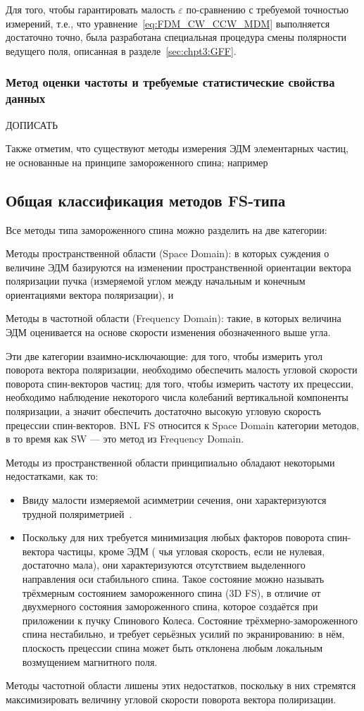 Для того, чтобы гарантировать малость $\varepsilon$ по-сравнению с требуемой точностью измерений, т.е., что уравнение~\eqref{eq:FDM_CW_CCW_MDM} выполняется достаточно точно, была разработана специальная процедура смены полярности ведущего поля, описанная в разделе~\ref{sec:chpt3:GFF}.

\subsubsection{Метод оценки частоты и требуемые статистические свойства данных}
ДОПИСАТЬ

Также отметим, что существуют методы измерения ЭДМ элементарных частиц, не основанные на принципе замороженного спина; например~\cite{COSY:SpinTuneMapping}

\subsection{Общая классификация методов FS-типа}
Все методы типа замороженного спина можно разделить на две категории: 
\begin{enumerate*}
	\item Методы пространственной области (Space Domain): в которых суждения о величине ЭДМ базируются на изменении пространственной ориентации вектора поляризации пучка (измеряемой углом между начальным и конечным ориентациями вектора поляризации), и 
	\item Методы в частотной области (Frequency Domain): такие, в которых величина ЭДМ оценивается на основе 
	скорости изменения обозначенного выше угла.
\end{enumerate*} 

Эти две категории взаимно-исключающие: для того, чтобы измерить
угол поворота вектора поляризации, необходимо обеспечить малость угловой скорости поворота спин-векторов
частиц; для того, чтобы измерить частоту их прецессии, необходимо наблюдение некоторого числа
колебаний вертикальной компоненты поляризации, а значит обеспечить достаточно высокую угловую скорость
прецессии спин-векторов. BNL FS относится к Space Domain категории методов, в то время как SW --- это
метод из Frequency Domain.

Методы из пространственной области принципиально обладают некоторыми недостатками, как то:
\begin{itemize}
	\item Ввиду малости измеряемой асимметрии сечения, они характеризуются трудной поляриметрией~\cite[стр.~6]{Mane:SpinWheel}.
	\item Поскольку для них требуется минимизация любых факторов поворота спин-вектора частицы, кроме ЭДМ (
	чья угловая скорость, если не нулевая, достаточно мала), они характеризуются отсутствием выделенного 
	направления оси стабильного спина. Такое состояние можно называть трёхмерным состоянием замороженного спина
	(3D FS), в отличие от двухмерного состояния замороженного спина, которое создаётся при приложении к
	пучку Спинового Колеса. Состояние трёхмерно-замороженного спина нестабильно, и требует серьёзных усилий
	по экранированию: в нём, плоскость прецессии спина может быть отклонена любым локальным возмущением магнитного поля.
\end{itemize}

Методы частотной области лишены этих недостатков, поскольку в них стремятся максимизировать величину
угловой скорости поворота вектора полиризации.
